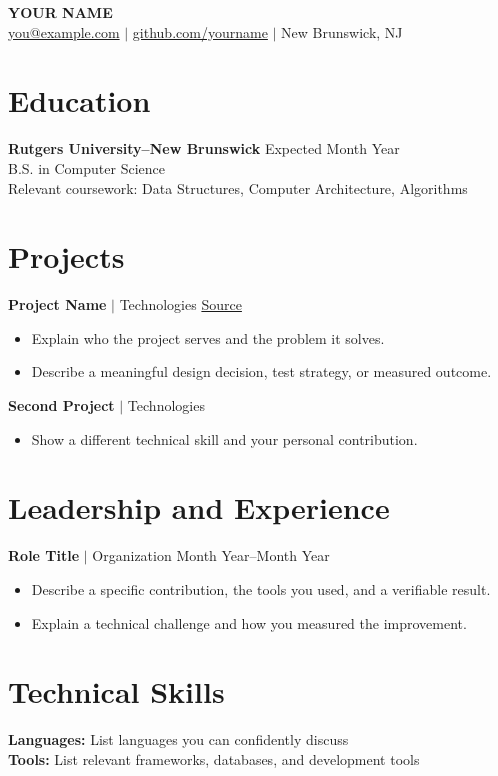\documentclass[11pt,letterpaper]{article}
\begin{document}
{\LARGE\bfseries YOUR NAME}\\[5pt]
\href{mailto:you@example.com}{you@example.com} $\vert$ \href{https://github.com/yourname}{github.com/yourname} $\vert$ New Brunswick, NJ
\section{Education}
\textbf{Rutgers University--New Brunswick} \hfill Expected Month Year\\
B.S. in Computer Science\\
Relevant coursework: Data Structures, Computer Architecture, Algorithms
\section{Projects}
\textbf{Project Name} $\vert$ Technologies \hfill \href{https://github.com/yourname/project}{Source}
\begin{itemize}
\item Explain who the project serves and the problem it solves.
\item Describe a meaningful design decision, test strategy, or measured outcome.
\end{itemize}
\textbf{Second Project} $\vert$ Technologies
\begin{itemize}
\item Show a different technical skill and your personal contribution.
\end{itemize}
\section{Leadership and Experience}
\textbf{Role Title} $\vert$ Organization \hfill Month Year--Month Year
\begin{itemize}
\item Describe a specific contribution, the tools you used, and a verifiable result.
\item Explain a technical challenge and how you measured the improvement.
\end{itemize}

\section{Technical Skills}
\textbf{Languages:} List languages you can confidently discuss\\
\textbf{Tools:} List relevant frameworks, databases, and development tools
\end{document}
